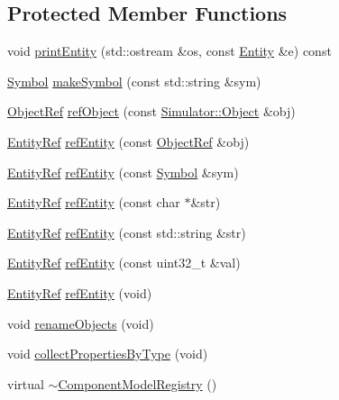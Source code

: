 \subsection*{Protected Member Functions}
\begin{DoxyCompactItemize}
\item 
void \hyperlink{class_component_model_registry_a23ca85547bf40688838f7691550fbb1b}{print\+Entity} (std\+::ostream \&os, const \hyperlink{struct_component_model_registry_1_1_entity}{Entity} \&e) const 
\item 
\hyperlink{class_component_model_registry_a76ae77a9f2c8f03598f7c45e3450cc49}{Symbol} \hyperlink{class_component_model_registry_a52c0bdf678cfbaa776c11da84b2be8b2}{make\+Symbol} (const std\+::string \&sym)
\item 
\hyperlink{class_component_model_registry_a315c966cec3143524c002daa7301b054}{Object\+Ref} \hyperlink{class_component_model_registry_a61f933c47ad1f6df23ecd13c6b8f54fc}{ref\+Object} (const \hyperlink{class_simulator_1_1_object}{Simulator\+::\+Object} \&obj)
\item 
\hyperlink{class_component_model_registry_ad5fd4e46e4b78c737db070735c2ffb16}{Entity\+Ref} \hyperlink{class_component_model_registry_a88be6f902bcef180d1ba7a83c052bd65}{ref\+Entity} (const \hyperlink{class_component_model_registry_a315c966cec3143524c002daa7301b054}{Object\+Ref} \&obj)
\item 
\hyperlink{class_component_model_registry_ad5fd4e46e4b78c737db070735c2ffb16}{Entity\+Ref} \hyperlink{class_component_model_registry_aaf0b419f650dc2769ed8fc94b36c585f}{ref\+Entity} (const \hyperlink{class_component_model_registry_a76ae77a9f2c8f03598f7c45e3450cc49}{Symbol} \&sym)
\item 
\hyperlink{class_component_model_registry_ad5fd4e46e4b78c737db070735c2ffb16}{Entity\+Ref} \hyperlink{class_component_model_registry_a1db53153b921c0e568558e1c5ef5d413}{ref\+Entity} (const char $\ast$\&str)
\item 
\hyperlink{class_component_model_registry_ad5fd4e46e4b78c737db070735c2ffb16}{Entity\+Ref} \hyperlink{class_component_model_registry_a7fea3f5f2901427a6f2a45c86fceeec4}{ref\+Entity} (const std\+::string \&str)
\item 
\hyperlink{class_component_model_registry_ad5fd4e46e4b78c737db070735c2ffb16}{Entity\+Ref} \hyperlink{class_component_model_registry_a769c5f97ee004cf96ef0bafaefad2e02}{ref\+Entity} (const uint32\+\_\+t \&val)
\item 
\hyperlink{class_component_model_registry_ad5fd4e46e4b78c737db070735c2ffb16}{Entity\+Ref} \hyperlink{class_component_model_registry_ac8b9db2b16f4839e315bc8adda6350c4}{ref\+Entity} (void)
\item 
void \hyperlink{class_component_model_registry_a52d78b0bb749e6f8c5151750fb8ab9a8}{rename\+Objects} (void)
\item 
void \hyperlink{class_component_model_registry_aeb7b7c79422430e85a2b707045c6aa63}{collect\+Properties\+By\+Type} (void)
\item 
virtual \hyperlink{class_component_model_registry_af72d06c3a9416c3dc4070a90a2e6be2b}{$\sim$\+Component\+Model\+Registry} ()
\end{DoxyCompactItemize}
